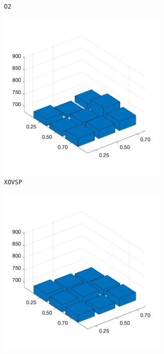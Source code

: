 \begin{figure}[H]
\begin{subfigure}[b]{0.25\textwidth}
		\caption{\texttt{O2}}
		\label{fig:x}
    	\end{subfigure}
%
	\begin{subfigure}[b]{0.25\textwidth}
		\centering
		\includegraphics[width=0.9\textwidth]{crossover/min/cross_sp_1.png}
		\caption{\texttt{XOVSP}}
		\label{fig:y}
    	\end{subfigure}
%
	\begin{subfigure}[b]{0.25\textwidth}
		\centering
		\includegraphics[width=0.9\textwidth]{crossover/min/cross_partial_map_1.png}

\end{subfigure}
\end{figure}
